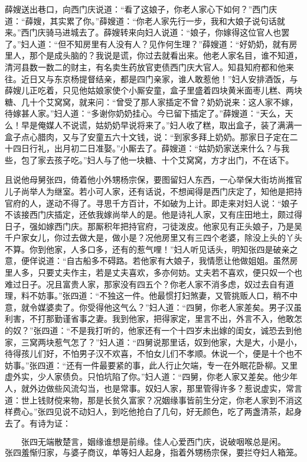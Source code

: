薛嫂送出巷口，向西门庆说道：“看了这娘子，你老人家心下如何？”西门庆道：“薛嫂，其实累了你。”薛嫂道：“你老人家先行一步，我和大娘子说句话就来。”西门庆骑马进城去了。薛嫂转来向妇人说道：“娘子，你嫁得这位官人也罢了。”妇人道：“但不知房里有人没有人？见作何生理？”薛嫂道：“好奶奶，就有房里人，那个是成头脑的？我说是谎，你过去就看出来。他老人家名目，谁不知道，清河县数一数二的财主，有名卖生药放官吏债西门庆大官人。知县知府都和他来往。近日又与东京杨提督结亲，都是四门亲家，谁人敢惹他！”妇人安排酒饭，与薛嫂儿正吃着，只见他姑娘家使个小厮安童，盒子里盛着四块黄米面枣儿糕、两块糖、几十个艾窝窝，就来问：“曾受了那人家插定不曾？奶奶说来：这人家不嫁，待嫁甚人家。”妇人道：“多谢你奶奶挂心。今已留下插定了。”薛嫂道：“天么，天么！早是俺媒人不说谎，姑奶奶早说将来了。”妇人收了糕，取出盒子，装了满满一盒子点心腊肉，又与了安童五六十文钱，说：“到家多拜上奶奶。那家日子定在二十四日行礼，出月初二日准娶。”小厮去了。薛嫂道：“姑奶奶家送来什么？与我些，包了家去孩子吃。”妇人与了他一块糖、十个艾窝窝，方才出门，不在话下。

且说他母舅张四，倚着他小外甥杨宗保，要图留妇人东西，一心举保大街坊尚推官儿子尚举人为继室。若小可人家，还有话说，不想闻得是西门庆定了，知他是把持官府的人，遂动不得了。寻思千方百计，不如破为上计。即走来对妇人说：“娘子不该接西门庆插定，还依我嫁尚举人的是。他是诗礼人家，又有庄田地土，颇过得日子，强如嫁西门庆。那厮积年把持官府，刁徒泼皮。他家见有正头娘子，乃是吴千户家女儿，你过去做大是，做小是？况他房里又有三四个老婆，除没上头的丫头不算。你到他家，人多口多，还有的惹气哩！”妇人听见话头，明知张四是破亲之意，便佯说道：“自古船多不碍路。若他家有大娘子，我情愿让他做姐姐。虽然房里人多，只要丈夫作主，若是丈夫喜欢，多亦何妨。丈夫若不喜欢，便只奴一个也难过日子。况且富贵人家，那家没有四五个？你老人家不消多虑，奴过去自有道理，料不妨事。”张四道：“不独这一件。他最惯打妇煞妻，又管挑贩人口，稍不中意，就令媒婆卖了。你受得他这气么？”妇人道：“四舅，你老人家差矣。男子汉虽利害，不打那勤谨省事之妻。我到他家，把得家定，里言不出，外言不入，他敢怎的奴？”张四道：“不是我打听的，他家还有一个十四岁未出嫁的闺女，诚恐去到他家，三窝两块惹气怎了？”妇人道：“四舅说那里话，奴到他家，大是大，小是小，待得孩儿们好，不怕男子汉不欢喜，不怕女儿们不孝顺。休说一个，便是十个也不妨事。”张四道：“还有一件最要紧的事，此人行止欠端，专一在外眠花卧柳。又里虚外实，少人家债负。只怕坑陷了你。”妇人道：“四舅，你老人家又差矣。他少年人，就外边做些风流勾当，也是常事。奴妇人家，那里管得许多？惹说虚实，常言道：世上钱财傥来物，那是长贫久富家？况姻缘事皆前生分定，你老人家到不消这样费心。”张四见说不动妇人，到吃他抢白了几句，好无颜色，吃了两盏清茶，起身去了。有诗为证：

\[
张四无端散楚言，姻缘谁想是前缘。
佳人心爱西门庆，说破咽喉总是闲。
\]
张四羞惭归家，与婆子商议，单等妇人起身，指着外甥杨宗保，要拦夺妇人箱笼。

